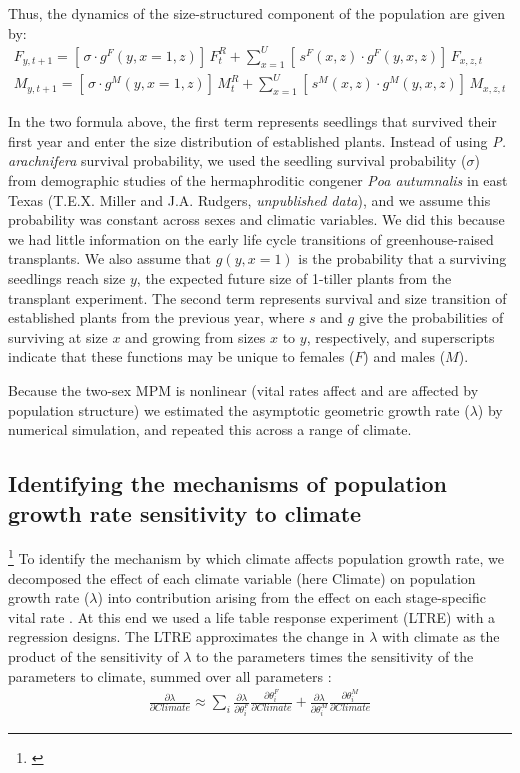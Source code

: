 \documentclass[11pt]{article}\usepackage[]{graphicx}\usepackage[usenames,dvipsnames]{xcolor}
\newcommand{\tom}[2]{{\color{red}{#1}}\footnote{\textit{\color{red}{#2}}}}
\begin{document}
Thus, the dynamics of the size-structured component of the population are given by:
\begin{align}\label{eq:dynamics}
F_{y,t+1} = [ \, \sigma \cdot g^{F}(y,x=1,z) ] \, F^{R}_{t} + \sum_{x=1}^{U} 	[ \, s^{F}(x,z) \cdot g^{F}(y,x,z)] \, F_{x,z,t}
\\
M_{y,t+1} = [ \, \sigma \cdot g^{M}(y,x=1,z) ] \, M^{R}_{t} + \sum_{x=1}^{U} 	[ \,  s^{M}(x,z) \cdot g^{M}(y,x,z) ] \, M_{x,z,t}
\end{align}

\noindent In the two formula above, the first term represents seedlings that survived their first year and enter the size distribution of established plants.
Instead of using \textit{P. arachnifera} survival probability, we used the seedling survival probability ($\sigma$) from demographic studies of the hermaphroditic congener \textit{Poa autumnalis} in east Texas (T.E.X. Miller and J.A. Rudgers, \textit{unpublished data}), and we assume this probability was constant across sexes and climatic variables. 
We did this because we had little information on the early life cycle transitions of greenhouse-raised transplants.
We also assume that $g(y,x=1)$ is the probability that a surviving seedlings reach size $y$, the expected future size of 1-tiller plants from the transplant experiment.
The second term represents survival and size transition of established plants from the previous year, where $s$ and $g$ give the probabilities of surviving at size $x$ and growing from sizes $x$ to $y$, respectively, and superscripts indicate that these functions may be unique to females ($F$) and males ($M$).

Because the two-sex MPM is nonlinear (vital rates affect and are affected by population structure) we estimated the asymptotic geometric growth rate ($\lambda$) by numerical simulation, and repeated this across a range of climate.

\subsection*{Identifying the mechanisms of population growth rate sensitivity to climate }
\tom{}{I don't think the LTRE analysis is adequately motivated by the Intro.}
To identify the mechanism by which climate affects population growth rate, we decomposed the effect of each climate variable (here Climate) on population growth rate ($\lambda$) into contribution arising from the effect on each stage-specific vital rate \citep{caswell2000matrix}.
At this end we used a life table response experiment (LTRE) with a regression designs. 
The LTRE approximates the change in $\lambda$ with climate  as the product of the sensitivity of $\lambda$ to the parameters times the sensitivity of the parameters to climate, summed over all parameters \citep{caswell1989analysis}:
\begin{align}\label{eq:ltre}
\frac{\partial \lambda}{\partial Climate} \approx \sum_{i} \frac{\partial \lambda}{\partial \theta^{F}_{i}} \frac{\partial \theta^{F}_{i}}{\partial Climate} + \frac{\partial \lambda}{\partial \theta^{M}_{i}} \frac{\partial \theta^{M}_{i}}{\partial Climate}
\end{align}
\end{document}
